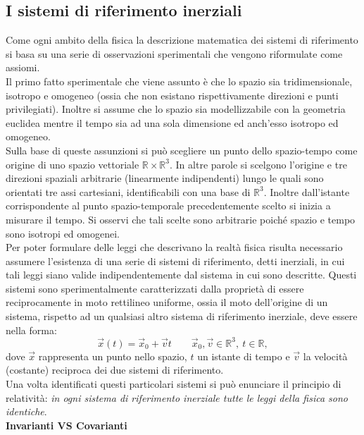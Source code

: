 \subsection{I sistemi di riferimento inerziali}
Come ogni ambito della fisica la descrizione matematica dei sistemi di riferimento si basa su una serie di osservazioni sperimentali che vengono riformulate come assiomi.\\

Il primo fatto sperimentale che viene assunto è che lo spazio sia tridimensionale, isotropo e omogeneo (ossia che non esistano rispettivamente direzioni e punti privilegiati). Inoltre si assume che lo spazio sia modellizzabile con la 
geometria euclidea mentre il tempo sia ad una sola dimensione ed anch'esso isotropo ed omogeneo.\\
Sulla base di queste assunzioni si può scegliere un punto dello spazio-tempo come 
origine di uno spazio vettoriale $\mathbb{R}\times\mathbb{R}^3$. In altre parole si scelgono l'origine e tre direzioni spaziali arbitrarie (linearmente indipendenti) lungo le quali sono orientati tre assi cartesiani, identificabili con una base di $\mathbb{R}^3$.
Inoltre dall'istante corrispondente al punto spazio-temporale precedentemente scelto si inizia a misurare il tempo. Si osservi che tali scelte sono arbitrarie poiché spazio e tempo sono isotropi ed omogenei.\\

Per poter formulare delle leggi che descrivano la realtà fisica risulta necessario assumere l'esistenza di una serie di sistemi di riferimento, detti inerziali, in cui tali leggi siano valide indipendentemente dal sistema in cui sono descritte. Questi sistemi sono sperimentalmente caratterizzati dalla proprietà di essere reciprocamente in moto rettilineo uniforme, ossia il moto dell'origine di un sistema, rispetto ad un qualsiasi altro sistema di riferimento inerziale, deve essere nella forma: 
\begin{equation}
	\vec x(t)=\vec x_0+\vec vt \qquad \vec x_0,\vec v\in \mathbb{R}^3, \ t\in\mathbb{R},
\end{equation}
dove $\vec x$ rappresenta un punto nello spazio, $t$ un istante di tempo e $\vec v$ la velocità (costante) reciproca dei due sistemi di riferimento.\\
Una volta identificati questi particolari sistemi  si può enunciare il principio di relatività: \emph{in ogni sistema di riferimento inerziale tutte le leggi della fisica sono identiche}.\\
\textbf{Invarianti VS Covarianti}


